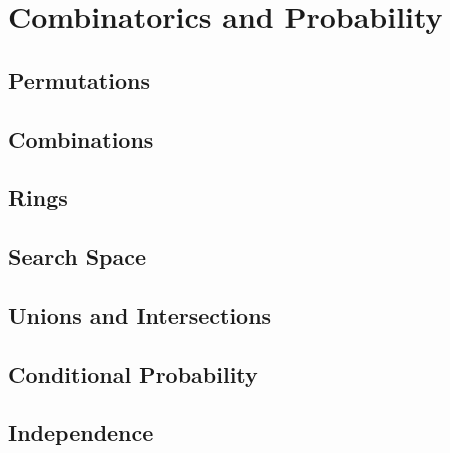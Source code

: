 \documentclass[../main]{subfiles}
\begin{document}
\section{Combinatorics and Probability}

\subsection{Permutations}

\subsection{Combinations}

\subsection{Rings}

\subsection{Search Space}

\subsection{Unions and Intersections}

\subsection{Conditional Probability}

\subsection{Independence}
\end{document}
